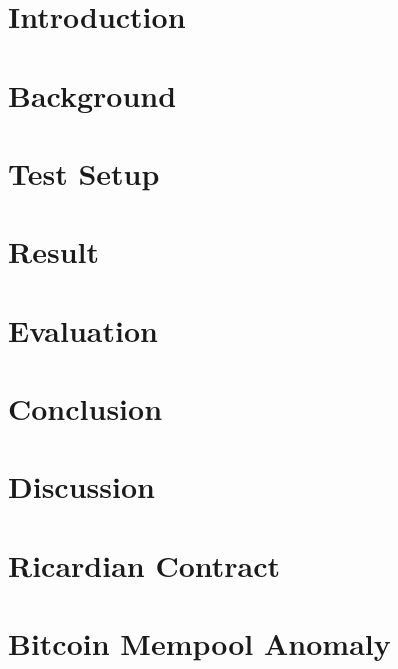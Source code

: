 \documentclass[Nomencl]{DylanMaster}
\begin{document}
\mytitlepage

\newpage

\tableofcontents

\newpage
\section{Introduction}


\newpage
\section{Background}


\newpage
\section{Test Setup}


\newpage
\section{Result}


\newpage
\section{Evaluation}


\newpage
\section{Conclusion}


\newpage
\section{Discussion}


\newpage
\appendix
\section{Ricardian Contract}


\newpage
\section{Bitcoin Mempool Anomaly}


\newpage


\end{document}
